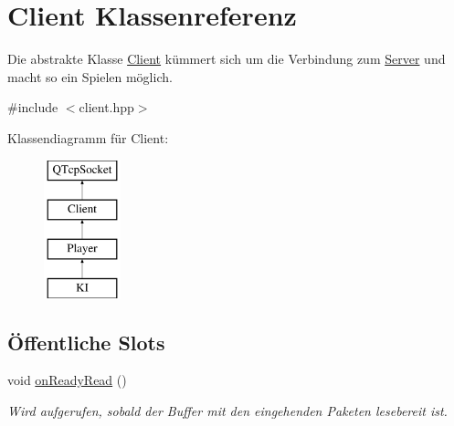 \hypertarget{class_client}{}\section{Client Klassenreferenz}
\label{class_client}


Die abstrakte Klasse \hyperlink{class_client}{Client} kümmert sich um die Verbindung zum \hyperlink{class_server}{Server} und macht so ein Spielen möglich.  




{\ttfamily \#include $<$client.\+hpp$>$}

Klassendiagramm für Client\+:\begin{figure}[H]
\begin{center}
\leavevmode
\includegraphics[height=4.000000cm]{class_client}
\end{center}
\end{figure}
\subsection*{Öffentliche Slots}
\begin{DoxyCompactItemize}
\item 
void \hyperlink{class_client_a1e1df136ba1989a25261aed93a46c6a1}{on\+Ready\+Read} ()
\begin{DoxyCompactList}\small\item\em Wird aufgerufen, sobald der Buffer mit den eingehenden Paketen lesebereit ist. \end{DoxyCompactList}\end{DoxyCompactItemize}
